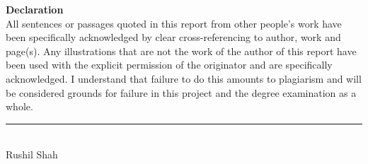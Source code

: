 \documentclass[../main.tex]{subfiles}
\begin{document}
\raggedright


\textbf{{\Huge Declaration}}\\[8mm]


All sentences or passages quoted in this report from other people's work have been specifically acknowledged by clear cross-referencing to author, work and page(s). Any illustrations that are not the work of the author of this report have been used with the explicit permission of the originator and are specifically acknowledged. I understand that failure to do this amounts to plagiarism and will be considered grounds for failure in this project and the degree examination as a whole.\\[16mm]

\noindent\rule{2.5cm}{0.4pt}\\[4mm]
Rushil Shah
\end{document}
